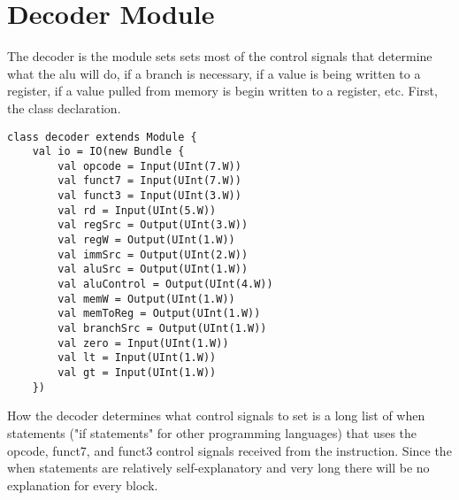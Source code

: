\documentclass[12pt, letterpaper]{report}
\begin{document}
\section{Decoder Module}
The decoder is the module sets sets most of the control signals that determine what the alu
will do, if a branch is necessary, if a value is being written to a register, if a value pulled from memory is begin written to a register, etc. First, the class declaration.

\begin{lstlisting}[style=scala]
   class decoder extends Module {
    val io = IO(new Bundle {
        val opcode = Input(UInt(7.W))
        val funct7 = Input(UInt(7.W))
        val funct3 = Input(UInt(3.W))
        val rd = Input(UInt(5.W))
        val regSrc = Output(UInt(3.W))
        val regW = Output(UInt(1.W))
        val immSrc = Output(UInt(2.W))
        val aluSrc = Output(UInt(1.W))
        val aluControl = Output(UInt(4.W))
        val memW = Output(UInt(1.W))
        val memToReg = Output(UInt(1.W))
        val branchSrc = Output(UInt(1.W))
        val zero = Input(UInt(1.W))
        val lt = Input(UInt(1.W))
        val gt = Input(UInt(1.W))
    })
\end{lstlisting}

How the decoder determines what control signals to set is a long list of when statements
("if statements" for other programming languages) that uses the opcode, funct7, and funct3 control signals received from the 
instruction. Since the when statements are relatively self-explanatory and very long there will be no explanation for every block.
\end{document}
